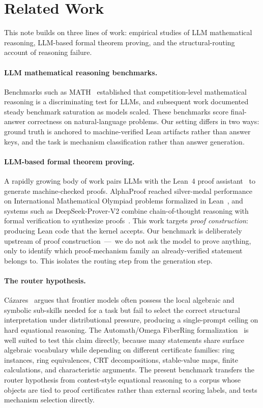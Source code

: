 \documentclass[11pt]{article}
\begin{document}
\section{Related Work}
\label{sec:related}

This note builds on three lines of work: empirical studies of LLM
mathematical reasoning, LLM-based formal theorem proving, and the
structural-routing account of reasoning failure.

\paragraph{LLM mathematical reasoning benchmarks.}
Benchmarks such as MATH~\citep{hendrycks2021math} established that
competition-level mathematical reasoning is a discriminating test for
LLMs, and subsequent work documented steady benchmark saturation as
models scaled. These benchmarks score final-answer correctness on
natural-language problems. Our setting differs in two ways: ground truth
is anchored to machine-verified Lean artifacts rather than answer keys,
and the task is mechanism classification rather than answer generation.

\paragraph{LLM-based formal theorem proving.}
A rapidly growing body of work pairs LLMs with the Lean~4 proof
assistant~\citep{demoura2021lean4} to generate machine-checked proofs.
AlphaProof reached silver-medal performance on International Mathematical
Olympiad problems formalized in Lean~\citep{deepmind2024alphaproof}, and
systems such as DeepSeek-Prover-V2 combine chain-of-thought reasoning with
formal verification to synthesize proofs~\citep{deepseekprover2025}.
This work targets \emph{proof construction}: producing Lean code that the
kernel accepts. Our benchmark is deliberately upstream of proof
construction~---~we do not ask the model to prove anything, only to
identify which proof-mechanism family an already-verified statement
belongs to. This isolates the routing step from the generation step.

\paragraph{The router hypothesis.}
C\'azares~\citep{sair2026} argues that frontier models often possess the
local algebraic and symbolic sub-skills needed for a task but fail to
select the correct structural interpretation under distributional
pressure, producing a single-prompt ceiling on hard equational reasoning.
The Automath/Omega FiberRing formalization~\citep{omega2026automath} is
well suited to test this claim directly, because many statements share
surface algebraic vocabulary while depending on different certificate
families: ring instances, ring equivalences, CRT decompositions,
stable-value maps, finite calculations, and characteristic arguments.
The present benchmark transfers the router hypothesis from contest-style
equational reasoning to a corpus whose objects are tied to proof
certificates rather than external scoring labels, and tests mechanism
selection directly.
\end{document}
